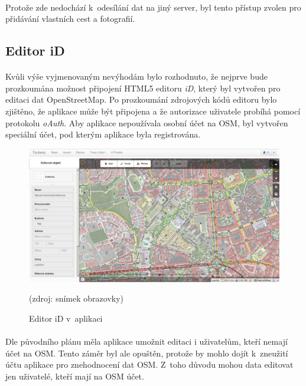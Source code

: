 \documentclass[11pt,a4paper,titlepage,oneside]{book}
\begin{document}
				\paragraph{} Protože zde nedochází k~odesílání dat na jiný server, byl tento přístup zvolen pro přidávání vlastních cest a fotografií.
			\subsection{Editor iD} 
				\paragraph{} Kvůli výše vyjmenovaným nevýhodám bylo rozhodnuto, že nejprve bude prozkoumána možnost připojení HTML5 editoru \textit{iD}, který byl vytvořen pro editaci dat OpenStreetMap. Po prozkoumání zdrojových kódů editoru bylo zjištěno, že aplikace může být připojena a že autorizace uživatele probíhá pomocí protokolu \textit{oAuth}. Aby aplikace nepoužívala osobní účet na \acl{OSM}, byl vytvořen speciální účet, pod kterým aplikace byla registrována. 

		\begin{figure}[!h]
			\begin{center}
				\includegraphics[width=12cm]{obrazky/toulavej/idToulavej.png}
				\caption{Editor iD v~aplikaci }
				\label{fig:idToulavej}
				(zdroj: snímek obrazovky)
			\end{center}
		\end{figure}	



				\paragraph{} Dle původního plánu měla aplikace umožnit editaci i uživatelům, kteří nemají účet na \acl{OSM}. Tento záměr byl ale opuštěn, protože by mohlo dojít k~zneužití účtu aplikace pro znehodnocení dat \acl{OSM}. Z~toho důvodu mohou data editovat jen uživatelé, kteří mají na \ac{OSM} účet.
\end{document}
